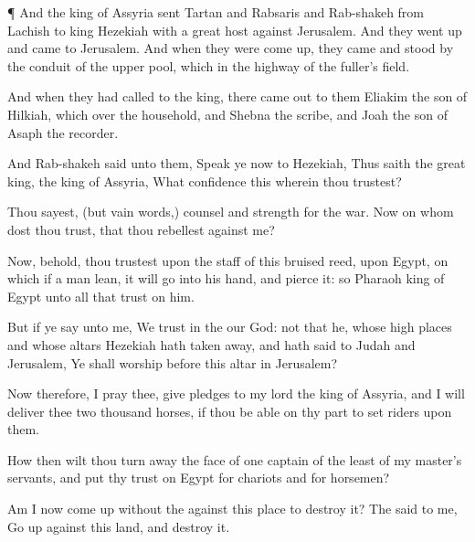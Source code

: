 {\par }{\PP {}¶ And the
king of
Assyria
sent
Tartan and
Rabsaris and
Rab-shakeh from
Lachish to
king
Hezekiah with a
great
host against
Jerusalem. And they went
up and
came to
Jerusalem. And when they were come
up, they
came and
stood by the
conduit of the
upper
pool, which
{} in the
highway of the
fuller’s
field.

And when they had
called to the
king, there came
out to them
Eliakim the
son of
Hilkiah, which
{} over the
household, and
Shebna the
scribe, and
Joah the
son of
Asaph the
recorder.

And
Rab-shakeh
said unto them,
Speak ye now to
Hezekiah, Thus
saith the
great
king, the
king of
Assyria, What
confidence
{} this wherein thou
trustest?

Thou
sayest, (but
{}
vain
words,)
{}
counsel and
strength for the
war. Now on whom dost thou
trust, that thou
rebellest against me?

Now, behold, thou
trustest upon the
staff of this
bruised
reed,
{} upon
Egypt, on which if a
man
lean, it will
go into his
hand, and
pierce it: so
{}
Pharaoh
king of
Egypt unto all that
trust on him.

But if ye
say unto me, We
trust in the
{} our
God:
{} not that he, whose high
places and whose
altars
Hezekiah hath taken
away, and hath
said to
Judah and
Jerusalem, Ye shall
worship
before this
altar in
Jerusalem?

Now therefore, I pray thee, give
pledges to my
lord the
king of
Assyria, and I will
deliver thee two
thousand
horses, if thou be
able on thy part to
set
riders upon them.

How then wilt thou turn
away the
face of
one
captain of the
least of my
master’s
servants, and put thy
trust on
Egypt for
chariots and for
horsemen?

Am I now come
up
without the
{} against this
place to
destroy it? The
{}
said to me, Go
up against this
land, and
destroy it.

}
